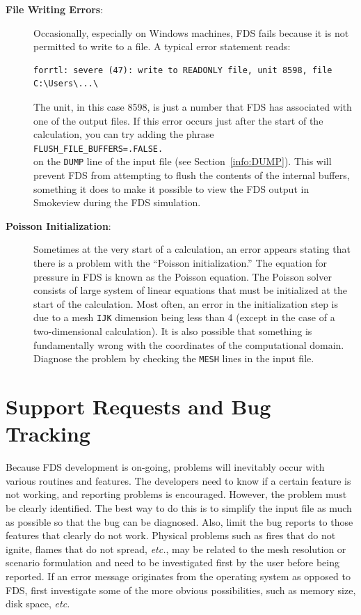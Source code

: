 \documentclass[11pt]{book}
\newcommand{\ct}{\tt\small}
\begin{document}
\begin{description}
\item[{\bf File Writing Errors}:]
Occasionally, especially on Windows machines, FDS fails because it is not permitted to write to a file. A typical error statement reads:
\footnotesize
\begin{verbatim}
forrtl: severe (47): write to READONLY file, unit 8598, file C:\Users\...\
\end{verbatim} \normalsize
The unit, in this case 8598, is just a number that FDS has associated with one of the output files. If this error occurs just after the start of
the calculation, you can try adding the phrase \\ {\ct FLUSH\_FILE\_BUFFERS=.FALSE.} \\ on the {\ct DUMP} line of the input file (see Section~\ref{info:DUMP}).
This will prevent FDS from attempting to flush the contents of the internal buffers, something it does to make it possible to view the FDS output
in Smokeview during the FDS simulation.

\item[{\bf Poisson Initialization}:]
Sometimes at the very start of a calculation, an error
appears stating that there is a problem with the ``Poisson initialization.'' The equation for
pressure in FDS is known as the Poisson equation. The Poisson solver consists of large system
of linear equations that must be initialized at the start of the calculation.
Most often, an error in the initialization step is due to a mesh {\ct IJK} dimension
being less than 4 (except in the case of a two-dimensional calculation). It is also possible that something is
fundamentally wrong with the coordinates of the computational domain. Diagnose the problem by
checking the {\ct MESH} lines in the input file.
\end{description}


\section{Support Requests and Bug Tracking}

Because FDS development is on-going, problems will inevitably occur
with various routines and features. The developers need to know if a certain
feature is not working, and reporting problems is encouraged. However, the
problem must be clearly identified. The best way to do this is to simplify
the input file as much as possible so that the bug can be diagnosed.
Also, limit the bug reports to those features that clearly do not work.
Physical problems such as fires that do not ignite, flames that do not
spread, {\em etc.}, may be related to the mesh resolution or scenario
formulation and need to be investigated first by the user before being
reported. If an error message originates from the operating system as
opposed to FDS, first investigate some of the more obvious possibilities,
such as memory size, disk space, {\em etc.}
\end{document}
